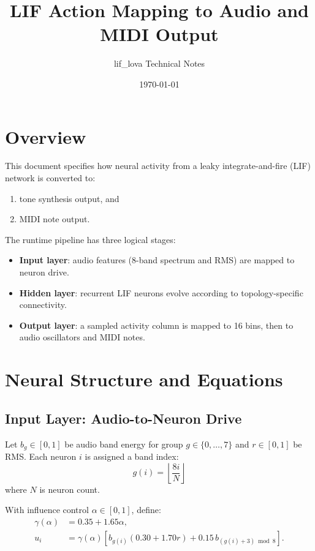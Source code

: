 \documentclass[11pt,a4paper]{article}
\title{LIF Action Mapping to Audio and MIDI Output}
\author{lif\_lova Technical Notes}
\date{\today}
\begin{document}
\maketitle

\section{Overview}

This document specifies how neural activity from a leaky integrate-and-fire (LIF) network
is converted to:
\begin{enumerate}
    \item tone synthesis output, and
    \item MIDI note output.
\end{enumerate}

The runtime pipeline has three logical stages:
\begin{itemize}
    \item \textbf{Input layer}: audio features (8-band spectrum and RMS) are mapped to neuron drive.
    \item \textbf{Hidden layer}: recurrent LIF neurons evolve according to topology-specific connectivity.
    \item \textbf{Output layer}: a sampled activity column is mapped to 16 bins, then to audio oscillators and MIDI notes.
\end{itemize}

\section{Neural Structure and Equations}

\subsection{Input Layer: Audio-to-Neuron Drive}

Let $b_g \in [0,1]$ be audio band energy for group $g \in \{0,\dots,7\}$ and $r \in [0,1]$ be RMS.
Each neuron $i$ is assigned a band index:
\begin{equation}
g(i) = \left\lfloor \frac{8i}{N} \right\rfloor
\end{equation}
where $N$ is neuron count.

With influence control $\alpha \in [0,1]$, define:
\begin{align}
\gamma(\alpha) &= 0.35 + 1.65\alpha, \\
u_i &= \gamma(\alpha)\left[b_{g(i)}\left(0.30 + 1.70r\right) + 0.15\,b_{(g(i)+3)\bmod 8}\right].
\end{align}
\end{document}
